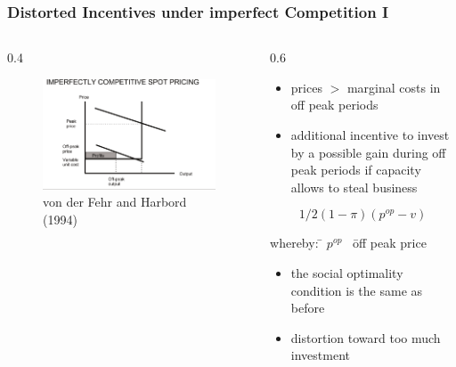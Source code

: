 \begin{frame}

\frametitle{Distorted Incentives under imperfect Competition I}
\begin{columns}
\begin{column} {0.4\textwidth}

\begin{figure}[h]
\centering
\includegraphics[width=1.\textwidth]{capacity/peak_load_toohigh}
    \caption{von der Fehr and Harbord (1994)}
    \label{fig:Daten 2004}            
\end{figure}
\end{column}

\begin{column} {0.6\textwidth}
\begin{itemize}
\item prices $>$ marginal costs in off peak periods 
\item additional incentive to invest by a possible gain during off peak periods if capacity allows to steal business
\end {itemize}
  
\begin{equation}
	1/2 (1-\pi) (p^{op}-v)
\end{equation} 
{\small
\begin{tabbing}
whereby: \= $p^{op}$ \  \= off peak price
\end{tabbing}}

\begin{itemize}
\item the social optimality condition is the same as before
\item distortion toward too much investment
\end {itemize}

\end{column}
\end{columns}
	

\end{frame}
